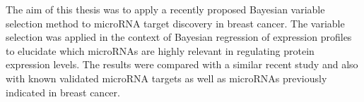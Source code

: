 The aim of this thesis was to apply a recently proposed Bayesian variable
selection method to microRNA target discovery in breast cancer. The variable
selection was applied in the context of Bayesian regression of expression
profiles to elucidate which microRNAs are highly relevant in regulating
protein expression levels. The results were compared with a similar recent
study and also with known validated microRNA targets as well as microRNAs
previously indicated in breast cancer.
